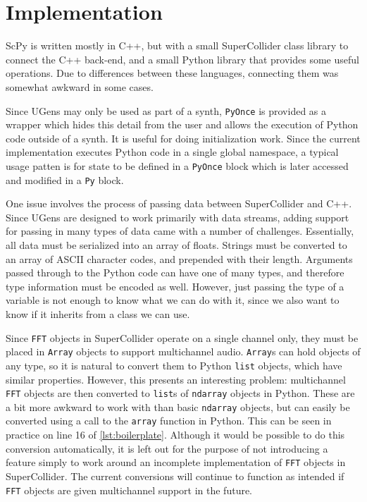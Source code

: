 \documentclass{article}
\begin{document}
\section{Implementation}\label{sec:implementation}

ScPy is written mostly in C++, but with a small SuperCollider class library to connect the C++
back-end, and a small Python library that provides some useful operations. Due to differences
between these languages, connecting them was somewhat awkward in some cases.

Since UGens may only be used as part of a synth, \texttt{PyOnce} is provided as a wrapper which
hides this detail from the user and allows the execution of Python code outside of a synth. It is
useful for doing initialization work. Since the current implementation executes Python code in a
single global namespace, a typical usage patten is for state to be defined in a \texttt{PyOnce}
block which is later accessed and modified in a \texttt{Py} block.

One issue involves the process of passing data between SuperCollider and C++. Since UGens are
designed to work primarily with data streams, adding support for passing in many types of data came
with a number of challenges. Essentially, all data must be serialized into an array of floats.
Strings must be converted to an array of ASCII character codes, and prepended with their length.
Arguments passed through to the Python code can have one of many types, and therefore type
information must be encoded as well. However, just passing the type of a variable is not enough to
know what we can do with it, since we also want to know if it inherits from a class we can use.

Since \texttt{FFT} objects in SuperCollider operate on a single channel only, they must be placed
in \texttt{Array} objects to support multichannel audio. \texttt{Array}s can hold objects of any
type, so it is natural to convert them to Python \texttt{list} objects, which have similar
properties. However, this presents an interesting problem: multichannel \texttt{FFT} objects are
then converted to \texttt{list}s of \texttt{ndarray} objects in Python. These are a bit more
awkward to work with than basic \texttt{ndarray} objects, but can easily be converted using a call
to the \texttt{array} function in Python. This can be seen in practice on line 16 of
\autoref{lst:boilerplate}. Although it would be possible to do this conversion
automatically, it is left out for the purpose of not introducing a feature simply to work around an
incomplete implementation of \texttt{FFT} objects in SuperCollider. The current conversions will
continue to function as intended if \texttt{FFT} objects are given multichannel support in the
future.
\end{document}
